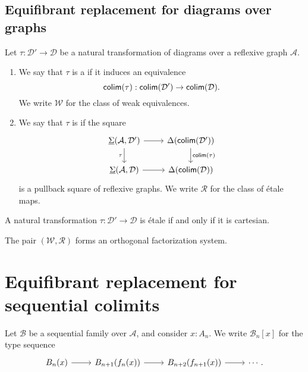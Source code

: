 \subsection{Equifibrant replacement for diagrams over graphs}

\begin{defn}
Let $\tau:\mathcal{D}'\to\mathcal{D}$ be a natural transformation of diagrams over a reflexive graph $\mathcal{A}$. 
\begin{enumerate}
\item We say that $\tau$ is a  if it induces an equivalence
\begin{equation*}
\mathsf{colim}(\tau):\mathsf{colim}(\mathcal{D}')\to\mathsf{colim}(\mathcal{D}).
\end{equation*}
We write $\mathcal{W}$ for the class of weak equivalences.
\item We say that $\tau$ is  if the square
\begin{equation*}
\begin{tikzcd}
\msm{\mathcal{A}}{\mathcal{D}'} \arrow[d,swap,"\tau"] \arrow[r] & \Delta(\tfcolim(\mathcal{D}')) \arrow[d,"\tfcolim(\tau)"] \\
\msm{\mathcal{A}}{\mathcal{D}} \arrow[r] & \Delta(\tfcolim(\mathcal{D}))
\end{tikzcd}
\end{equation*}
is a pullback square of reflexive graphs. We write $\mathcal{R}$ for the class of \'etale maps.
\end{enumerate}
\end{defn}

\begin{thm}
A natural transformation $\tau:\mathcal{D}'\to\mathcal{D}$ is \'etale if and only if it is cartesian.
\end{thm}

\begin{thm}
The pair $(\mathcal{W},\mathcal{R})$ forms an orthogonal factorization system. 
\end{thm}

\section{Equifibrant replacement for sequential colimits}\label{sec:seqcolim_eqf}%

\begin{defn}
Let $\mathcal{B}$ be a sequential family over $\mathcal{A}$, and consider $x:A_n$. We write $\mathcal{B}_n[x]$ for the type sequence
\begin{equation*}
\begin{tikzcd}
B_n(x) \arrow[r] & B_{n+1}(f_n(x)) \arrow[r] & B_{n+2}(f_{n+1}(x)) \arrow[r] & \cdots.
\end{tikzcd}
\end{equation*}
\end{defn}

